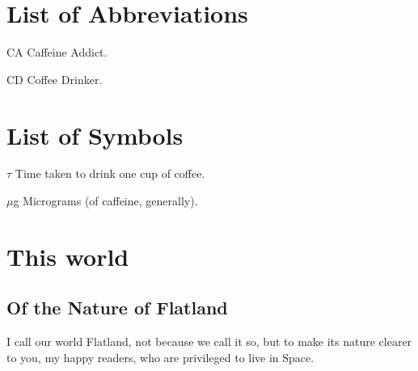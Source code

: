 \documentclass[edeposit,fullpage]{uiucthesis2009}
\begin{document}

\tableofcontents
\listoftables
\listoffigures

\chapter{List of Abbreviations}

\begin{symbollist*}
\item[CA] Caffeine Addict.
\item[CD] Coffee Drinker.
\end{symbollist*}

\chapter{List of Symbols}

\begin{symbollist}[0.7in]
\item[$\tau$] Time taken to drink one cup of coffee.
\item[$\mu$g] Micrograms (of caffeine, generally).
\end{symbollist}

\mainmatter
\chapter{This world}
\section{Of the Nature of Flatland}

I call our world Flatland, not because we call it so, but to make its
nature clearer to you, my happy readers, who are privileged to live in
Space.
\end{document}
